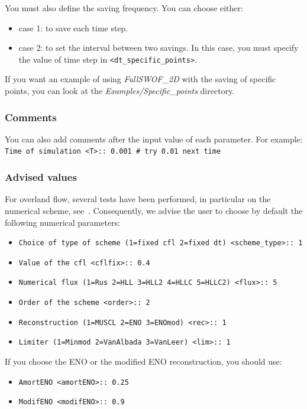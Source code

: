 \documentclass[a4paper, 11pt]{article}
\newcommand{\FullSWOF}{\emph{FullSWOF\_2D}}
\begin{document}
You must also define the saving frequency. You can choose either:
\begin{itemize}
\item case 1: to save each time step. 
\item case 2: to set the interval between two savings. In this case, you must specify the value of time step in \texttt{<dt\_specific\_points>}.
\end{itemize}

If you want an example of using \FullSWOF{} with the saving of specific points, you can look at the \textit{Examples/Specific\_points} directory.

\subsubsection{Comments}
You can also add comments after the input value of each parameter. For  example:\\
\verb!Time of simulation <T>:: 0.001 # try 0.01 next time!

\subsubsection{Advised values}\label{rem:default}
For overland flow, several tests have been performed, in particular on the numerical scheme, see~\cite{Delestre10b}. 
Consequently, we advise the user to choose by default the following numerical parameters:
\begin{itemize}
\item \texttt{Choice of type of scheme (1=fixed cfl  2=fixed dt) <scheme\_type>:: 1}
\item \texttt{Value of the cfl  <cflfix>:: 0.4}
\item \texttt{Numerical flux (1=Rus 2=HLL 3=HLL2 4=HLLC 5=HLLC2) <flux>:: 5}
\item \texttt{Order of the scheme <order>:: 2}
\item \texttt{Reconstruction (1=MUSCL 2=ENO 3=ENOmod) <rec>:: 1}
\item \texttt{Limiter (1=Minmod 2=VanAlbada 3=VanLeer) <lim>:: 1}
\end{itemize}

If you choose the ENO or the modified ENO reconstruction, you should use:
\begin{itemize}
\item \texttt{AmortENO <amortENO>:: 0.25}
\item \texttt{ModifENO <modifENO>:: 0.9}
\end{itemize}
\end{document}
